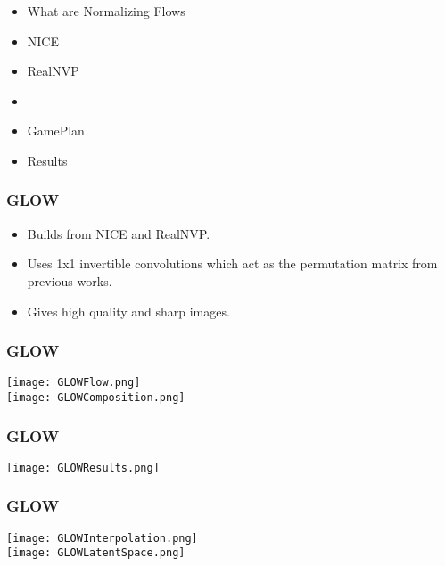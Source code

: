 \begin{frame}
\begin{itemize}
    \item What are Normalizing Flows
    \item NICE
    \item RealNVP
    \item \textbf{\color{red}{GLOW}}
    \item GamePlan
    \item Results
\end{itemize}
\end{frame}

\begin{frame}
    \frametitle{GLOW}
    \begin{itemize}
        \item Builds from NICE and RealNVP.
        \item Uses 1x1 invertible convolutions which act as the permutation
            matrix from previous works.
        \item Gives high quality and sharp images.
    \end{itemize}
\end{frame}

\begin{frame}
    \frametitle{GLOW}
    \center\texttt{[image: GLOWFlow.png]}\\
    \center\texttt{[image: GLOWComposition.png]}
\end{frame}

\begin{frame}
    \frametitle{GLOW}
    \center\texttt{[image: GLOWResults.png]}
\end{frame}

\begin{frame}
    \frametitle{GLOW}
    \center\texttt{[image: GLOWInterpolation.png]}\\
    \center\texttt{[image: GLOWLatentSpace.png]}\\
\end{frame}

